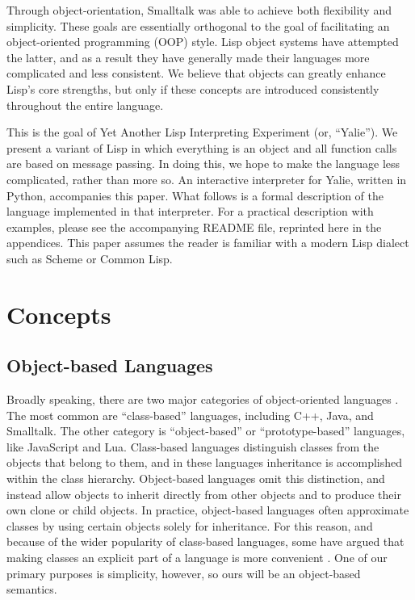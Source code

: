 \documentclass[twocolumn]{article}
\begin{document}
Through object-orientation, Smalltalk was able to achieve both
flexibility and simplicity. These goals are essentially orthogonal to
the goal of facilitating an object-oriented programming (OOP)
style. Lisp object systems have attempted the latter, and as a result
they have generally made their languages more complicated and less
consistent. We believe that objects can greatly enhance Lisp's core
strengths, but only if these concepts are introduced consistently
throughout the entire language.

This is the goal of Yet Another Lisp Interpreting Experiment (or,
``Yalie''). We present a variant of Lisp in which everything is an
object and all function calls are based on message passing. In doing
this, we hope to make the language less complicated, rather than more
so. An interactive interpreter for Yalie, written in Python,
accompanies this paper. What follows is a formal description of the
language implemented in that interpreter. For a practical description
with examples, please see the accompanying README file, reprinted here
in the appendices. This paper assumes the reader is familiar with a
modern Lisp dialect such as Scheme or Common Lisp.

\section*{Concepts}
\subsection*{Object-based Languages}
Broadly speaking, there are two major categories of object-oriented
languages \cite{Abadi}. The most common are ``class-based'' languages,
including C++, Java, and Smalltalk. The other category is
``object-based'' or ``prototype-based'' languages, like JavaScript and
Lua. Class-based languages distinguish classes from the objects that
belong to them, and in these languages inheritance is accomplished
within the class hierarchy. Object-based languages omit this
distinction, and instead allow objects to inherit directly from other
objects and to produce their own clone or child objects. In practice,
object-based languages often approximate classes by using certain
objects solely for inheritance. For this reason, and because of the
wider popularity of class-based languages, some have argued that
making classes an explicit part of a language is more convenient
\cite{Bruce}. One of our primary purposes is simplicity, however, so
ours will be an object-based semantics.
\end{document}
